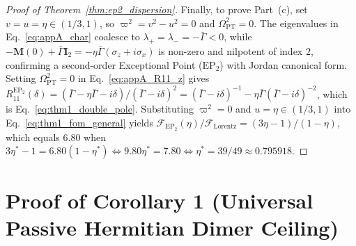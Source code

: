 \documentclass[11pt,letterpaper]{article}
\theoremstyle{definition}
\theoremstyle{remark}
\begin{document}
\begin{proof}[Proof of Theorem~\ref{thm:ep2_dispersion}]
Finally, to prove Part~(c), set $v = u = \eta \in (1/3, 1)$, so $\varpi^2 = v^2 - u^2 = 0$ and $\Omega_{\mathrm{PT}}^2 = 0$. The eigenvalues in Eq.~\eqref{eq:appA_char} coalesce to $\lambda_+ = \lambda_- = -\bar{\Gamma} < 0$, while $-\mathbf{M}(0) + \bar{\Gamma}\mathbf{I}_2 = -\eta\bar{\Gamma}(\sigma_z + i\sigma_x)$ is non-zero and nilpotent of index $2$, confirming a second-order Exceptional Point ($\mathrm{EP}_2$) with Jordan canonical form. Setting $\Omega_{\mathrm{PT}}^2 = 0$ in Eq.~\eqref{eq:appA_R11_z} gives $R_{11}^{\mathrm{EP}_2}(\delta) = (\bar{\Gamma} - \eta\bar{\Gamma} - i\delta)/(\bar{\Gamma} - i\delta)^2 = (\bar{\Gamma} - i\delta)^{-1} - \eta\bar{\Gamma}(\bar{\Gamma} - i\delta)^{-2}$, which is Eq.~\eqref{eq:thm1_double_pole}. Substituting $\varpi^2 = 0$ and $u = \eta \in (1/3, 1)$ into Eq.~\eqref{eq:thm1_fom_general} yields $\mathcal{F}_{\mathrm{EP}_2}(\eta)/\mathcal{F}_{\mathrm{Lorentz}} = (3\eta - 1)/(1 - \eta)$, which equals $6.80$ when $3\eta^* - 1 = 6.80(1 - \eta^*) \iff 9.80\eta^* = 7.80 \iff \eta^* = 39/49 \approx 0.795918$.
\end{proof}

\section{Proof of Corollary 1 (Universal Passive Hermitian Dimer Ceiling)}
\label{app:proof_cor1}
\end{document}
